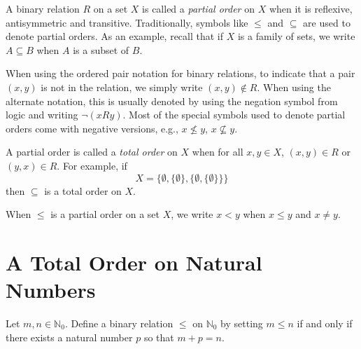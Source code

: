 A binary relation $R$ on a set $X$ is called a \textit{partial order} on
$X$ when it is reflexive, antisymmetric and transitive.
Traditionally, symbols like $\le$ and $\subseteq$ are used to denote
partial orders.  As an example, recall that if $X$ is a family of sets, 
we write $A\subseteq B$ when $A$ is a subset of $B$.  

When using the ordered pair notation for binary relations,
to indicate that a pair $(x,y)$ is not in the relation,
we simply write $(x,y)\notin R$. When using the alternate
notation, this is usually denoted by using the negation
symbol from logic and writing $\lnot (xRy)$.  Most of the
special symbols used to denote partial orders 
come with negative versions, e.g., $x\not\le y$, $x\nsubseteq y$.

A partial order is called a \textit{total order} on $X$ when for
all $x,y\in X$, $(x,y)\in R$ or $(y,x)\in R$.  For example,
if 
\[
X=\{\emptyset,\{\emptyset\},\{\emptyset,\{\emptyset\}\}\}
\]
then $\subseteq$ is a total order on $X$.

When $\le$ is a partial order on a set $X$, we write
$x<y$ when $x\le y$ and $x\neq y$.

\section{A Total Order on Natural Numbers}\label{s:background:total-order-N}

Let $m,n\in \mathbb{N}_0$. Define a binary relation $\le$ on
$\mathbb{N}_0$ by setting $m\le n$ if and only if
there exists a natural number $p$ so
that $m+p=n$.  

